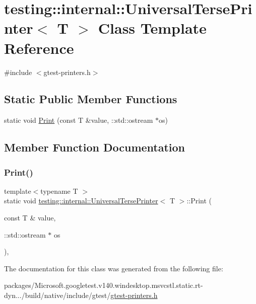 \hypertarget{classtesting_1_1internal_1_1_universal_terse_printer}{}\section{testing\+::internal\+::Universal\+Terse\+Printer$<$ T $>$ Class Template Reference}
\label{classtesting_1_1internal_1_1_universal_terse_printer}


{\ttfamily \#include $<$gtest-\/printers.\+h$>$}

\subsection*{Static Public Member Functions}
\begin{DoxyCompactItemize}
\item 
static void \mbox{\hyperlink{classtesting_1_1internal_1_1_universal_terse_printer_a042249cdb42fdb77588c9ad54ea7ed54}{Print}} (const T \&value, \+::std\+::ostream $\ast$os)
\end{DoxyCompactItemize}


\subsection{Member Function Documentation}
\mbox{\label{classtesting_1_1internal_1_1_universal_terse_printer_a042249cdb42fdb77588c9ad54ea7ed54}} 
\subsubsection{\texorpdfstring{Print()}{Print()}}
{\footnotesize\ttfamily template$<$typename T $>$ \\
static void \mbox{\hyperlink{classtesting_1_1internal_1_1_universal_terse_printer}{testing\+::internal\+::\+Universal\+Terse\+Printer}}$<$ T $>$\+::Print (\begin{DoxyParamCaption}\item[{const T \&}]{value,  }\item[{\+::std\+::ostream $\ast$}]{os }\end{DoxyParamCaption})\hspace{0.3cm}{\ttfamily [inline]}, {\ttfamily [static]}}



The documentation for this class was generated from the following file\+:\begin{DoxyCompactItemize}
\item 
packages/\+Microsoft.\+googletest.\+v140.\+windesktop.\+msvcstl.\+static.\+rt-\/dyn.../build/native/include/gtest/\mbox{\hyperlink{gtest-printers_8h}{gtest-\/printers.\+h}}\end{DoxyCompactItemize}
